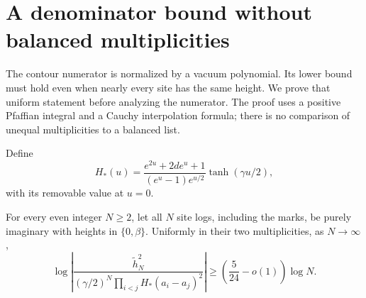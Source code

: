 \section{A denominator bound without balanced multiplicities}
\label{sec:denominator}

The contour numerator is normalized by a vacuum polynomial. Its lower
bound must hold even when nearly every site has the same height. We
prove that uniform statement before analyzing the numerator. The proof
uses a positive Pfaffian integral and a Cauchy interpolation formula;
there is no comparison of unequal multiplicities to a balanced list.


Define
\[
 H_*(u)=
 \frac{e^{2u}+2de^u+1}{(e^u-1)e^{u/2}}
 \tanh(\gamma u/2),
\]
with its removable value at \(u=0\).

\begin{theorem}
\label{thm:06-denominator}
For every even integer \(N\ge2\), let all \(N\) site logs, including the marks,
be purely imaginary with heights in \(\{0,\beta\}\).  Uniformly in
their two multiplicities, as \(N\to\infty\),
\begin{equation}
 \log\left|
 \frac{\widetilde h_N^2}
 {(\gamma/2)^N\prod_{i<j}H_*(a_i-a_j)^2}
 \right|
 \ge \left(\frac5{24}-o(1)\right)\log N .
 \label{eq:06-denominator}
\end{equation}
\end{theorem}

